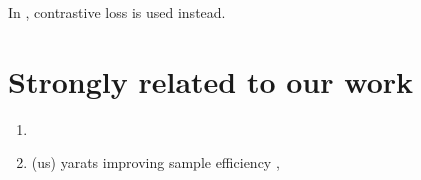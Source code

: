 In \cite{curl}, contrastive loss is used instead.


\section{Strongly related to our work}
\begin{enumerate}
		\item 
		\item (us) yarats improving sample efficiency \cite{sac+ae}, \cite{laser}
\end{enumerate}

